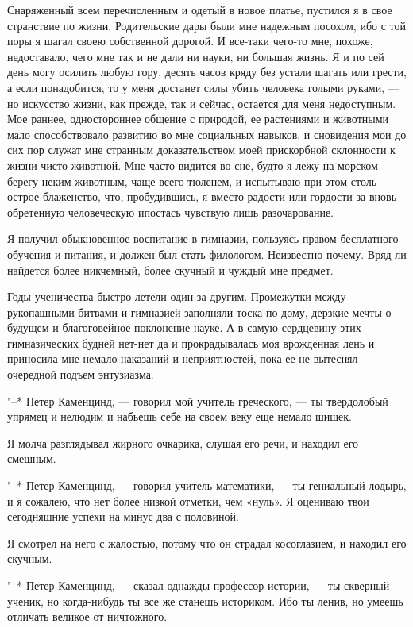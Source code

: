 Снаряженный всем перечисленным  и одетый в новое платье,  пустился я в
свое странствие по жизни. Родительские дары были мне надежным посохом,
ибо с той  поры я шагал своею собственной дорогой.  И все-таки чего-то
мне, похоже, недоставало, чего мне так  и не дали ни науки, ни большая
жизнь. Я и по сей день могу осилить любую гору, десять часов кряду без
устали шагать или грести, а если  понадобится, то у меня достанет силы
убить человека голыми руками, ---  но искусство жизни, как прежде, так
и  сейчас, остается  для меня  недоступным. Мое  раннее, одностороннее
общение  с природой,  ее  растениями и  животными мало  способствовало
развитию во мне социальных навыков, и сновидения мои до сих пор служат
мне странным доказательством моей прискорбной склонности к жизни чисто
животной. Мне  часто видится во  сне, будто  я лежу на  морском берегу
неким животным, чаще всего тюленем,  и испытываю при этом столь острое
блаженство, что, пробудившись, я вместо  радости или гордости за вновь
обретенную человеческую ипостась чувствую лишь разочарование.

Я  получил  обыкновенное  воспитание   в  гимназии,  пользуясь  правом
бесплатного  обучения  и  питания,   и  должен  был  стать  филологом.
Неизвестно почему. Вряд  ли найдется более никчемный,  более скучный и
чуждый мне предмет.

Годы  ученичества  быстро  летели  один за  другим.  Промежутки  между
рукопашными битвами и гимназией заполняли тоска по дому, дерзкие мечты
о будущем и благоговейное поклонение  науке. А в самую сердцевину этих
гимназических будней нет-нет да и прокрадывалась моя врожденная лень и
приносила мне  немало наказаний и  неприятностей, пока ее  не вытеснял
очередной подъем энтузиазма.

"--*  Петер Каменцинд,  ---  говорил мой  учитель  греческого, ---  ты
твердолобый упрямец и нелюдим и набьешь  себе на своем веку еще немало
шишек.

Я молча разглядывал  жирного очкарика, слушая его речи,  и находил его
смешным.

"--*  Петер   Каменцинд,  ---  говорил  учитель   математики,  ---  ты
гениальный  лодырь, и  я сожалею,  что нет  более низкой  отметки, чем
«нуль». Я оцениваю твои сегодняшние успехи на минус два с половиной.

Я смотрел  на него с  жалостью, потому  что он страдал  косоглазием, и
находил его скучным.

"--* Петер  Каменцинд, ---  сказал однажды  профессор истории,  --- ты
скверный ученик, но  когда-нибудь ты все же станешь  историком. Ибо ты
ленив, но умеешь отличать великое от ничтожного.


